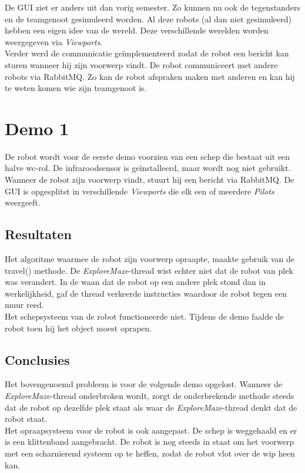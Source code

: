 \documentclass[tt2]{penoverslag}
\begin{document}
De GUI ziet er anders uit dan vorig semester. Zo kunnen nu ook de tegenstanders en de teamgenoot gesimuleerd worden. Al deze robots (al dan niet gesimuleerd) hebben een eigen idee van de wereld. Deze verschillende werelden worden weergegeven via \textit{Viewports}.\\

Verder werd de communicatie ge\"implementeerd zodat de robot een bericht kan sturen wanneer hij zijn voorwerp vindt. 
De robot communiceert met andere robots via RabbitMQ. Zo kan de robot afspraken maken met anderen en kan hij te weten komen wie zijn teamgenoot is.
 


\newpage
\makeappendix

\section{Demo 1} %
\label{Asec:demo1}
De robot wordt voor de eerste demo voorzien van een schep die bestaat uit een halve wc-rol. De infraroodsensor is ge\"installeerd, maar wordt nog niet gebruikt. Wanneer de robot zijn voorwerp vindt, stuurt hij een bericht via RabbitMQ. De GUI is opgesplitst in verschillende \textit{Viewports} die elk een of meerdere \textit{Pilots} weergeeft.

\subsection{Resultaten} %
\label{Assec:result1}
Het algoritme waarmee de robot zijn voorwerp opraapte, maakte gebruik van de travel() methode. De \textit{ExploreMaze}-thread wist echter niet dat de robot van plek was verandert. In de waan dat de robot op een andere plek stond dan in werkelijkheid, gaf de thread verkeerde instructies waardoor de robot tegen een muur reed. \\
Het schepsysteem van de robot functioneerde niet. Tijdens de demo faalde de robot toen hij het object moest oprapen. 

\subsection{Conclusies} %
\label{Assec:conc1}
Het bovengenoemd probleem is voor de volgende demo opgelost. Wanneer de \textit{ExploreMaze}-thread onderbroken wordt, zorgt de onderbrekende methode steeds dat de robot op dezelfde plek staat als waar de \textit{ExploreMaze}-thread denkt dat de robot staat.\\
Het opraapsysteem voor de robot is ook aangepast. De schep is weggehaald en er is een klittenband aangebracht. De robot is nog steeds in staat om het voorwerp met een scharnierend systeem op te heffen, zodat de robot vlot over de wip heen kan.
\end{document}
